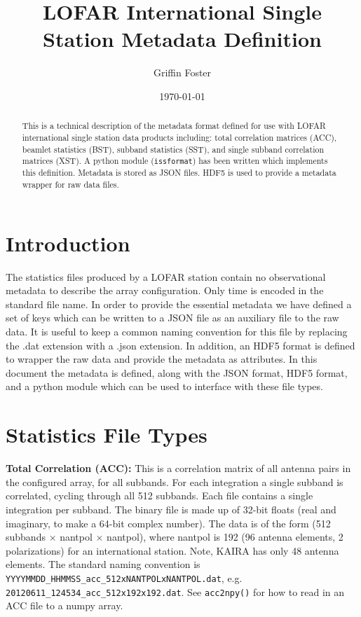 \documentclass[10pt,a4paper]{article}
\begin{document}
\title{LOFAR International Single Station Metadata Definition}
\author{Griffin Foster}
\date{\today}
\maketitle

\begin{abstract}
This is a technical description of the metadata format defined for use with
LOFAR international single station data products including: total correlation
matrices (ACC), beamlet statistics (BST), subband statistics (SST), and single
subband correlation matrices (XST). A python module (\texttt{issformat}) has
been written which implements this definition. Metadata is stored as JSON files.
HDF5 is used to provide a metadata wrapper for raw data files.
\end{abstract}

\section{Introduction}
\label{sec:intro}

The statistics files produced by a LOFAR station contain no observational
metadata to describe the array configuration. Only time is encoded in the
standard file name. In order to provide the essential metadata we have defined a
set of keys which can be written to a JSON file as an auxiliary file to the raw
data. It is useful to keep a common naming convention for this file by replacing
the .dat extension with a .json extension. In addition, an HDF5 format is
defined to wrapper the raw data and provide the metadata as attributes. In this
document the metadata is defined, along with the JSON format, HDF5 format, and a
python module which can be used to interface with these file types.

\section{Statistics File Types}

\noindent\textbf{Total Correlation (ACC):} This is a correlation matrix of all
antenna pairs in the configured array, for all subbands. For each integration a
single subband is correlated, cycling through all 512 subbands. Each file
contains a single integration per subband. The binary file is made up of 32-bit
floats (real and imaginary, to make a 64-bit complex number). The data is of the
form (512 subbands $\times$ nantpol $\times$ nantpol), where nantpol is 192 (96
antenna elements, 2 polarizations) for an international station. Note, KAIRA has
only 48 antenna elements. The standard naming convention is
\texttt{YYYYMMDD\_HHMMSS\_acc\_512xNANTPOLxNANTPOL.dat}, e.g.
\texttt{20120611\_124534\_acc\_512x192x192.dat}. See \texttt{acc2npy()} for how
to read in an ACC file to a numpy array.
\\
\end{document}
